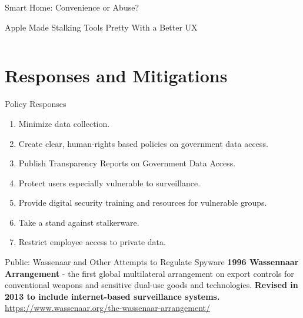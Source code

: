 \documentclass[nobackground,dvipsnames,table]{beamer}
\begin{document}
\begin{frame}{Smart Home: Convenience or Abuse?}
\end{frame}

\begin{frame}{Apple Made Stalking Tools Pretty With a Better UX}
    \begin{columns}
    \end{columns}
\end{frame}

\section{Responses and Mitigations}

\begin{frame}{Policy Responses}
    \begin{enumerate}
        \item Minimize data collection.
        \item Create clear, human-rights based policies on government data access.
        \item Publish Transparency Reports on Government Data Access.
        \item Protect users especially vulnerable to surveillance.
        \item Provide digital security training and resources for vulnerable groups.
        \item Take a stand against stalkerware.
        \item Restrict employee access to private data.
    \end{enumerate}
\end{frame}

\begin{frame}{Public: Wassenaar and Other Attempts to Regulate Spyware}
    \textbf{1996 Wassennaar Arrangement} - the first global multilateral arrangement on export controls for conventional weapons and sensitive dual-use goods and technologies. \textbf{Revised in 2013 to include internet-based surveillance systems.}\\
    \footnotesize
    \href{wassenaar.org}{https://www.wassenaar.org/the-wassenaar-arrangement/}
    \begin{columns}
    \end{columns}
\end{frame}
\end{document}
